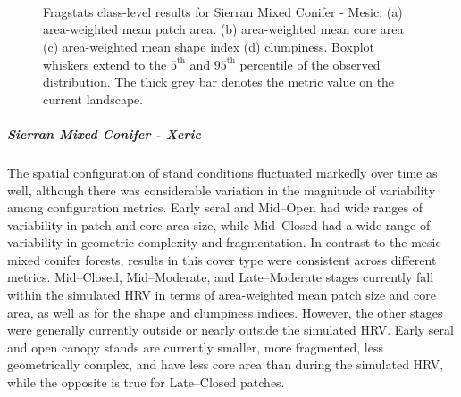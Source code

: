 \begin{figure}[!htbp]
  \centering
   \\
   \\
   \\
\caption{Fragstats class-level results for Sierran Mixed Conifer - Mesic. (a) area-weighted mean patch area. (b) area-weighted mean core area (c) area-weighted mean shape index (d) clumpiness. Boxplot whiskers extend to the $5^{\text{th}}$ and $95^{\text{th}}$ percentile of the observed distribution. The thick grey bar denotes the metric value on the current landscape.}
\label{fig:fragclass_smcm}
\end{figure}




\subparagraph{Sierran Mixed Conifer - Xeric}
The spatial configuration of stand conditions fluctuated markedly over time as well, although there was considerable variation in the magnitude of variability among configuration metrics. Early seral and Mid--Open had wide ranges of variability in patch and core area size, while Mid--Closed had a wide range of variability in geometric complexity and fragmentation. In contrast to the mesic mixed conifer forests, results in this cover type were consistent across different metrics. Mid--Closed, Mid--Moderate, and Late--Moderate stages currently fall within the simulated HRV in terms of area-weighted mean patch size and core area, as well as for the shape and clumpiness indices. However, the other stages were generally currently outside or nearly outside the simulated HRV. Early seral and open canopy stands are currently smaller, more fragmented, less geometrically complex, and have less core area than during the simulated HRV, while the opposite is true for Late--Closed patches.


